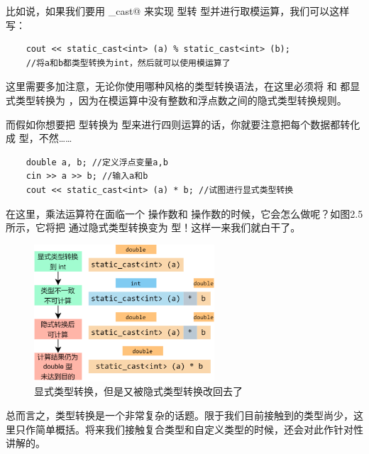 比如说，如果我们要用 \lstinline@static_cast@ 来实现 \lstinline@double@ 型转 \lstinline@int@ 型并进行取模运算，我们可以这样写：
\begin{lstlisting}
    cout << static_cast<int> (a) % static_cast<int> (b);
    //将a和b都类型转换为int，然后就可以使用模运算了
\end{lstlisting}
这里需要多加注意，无论你使用哪种风格的类型转换语法，在这里必须将 \lstinline@a@ 和 \lstinline@b@ 都显式类型转换为 \lstinline@int@，因为在模运算中没有整数和浮点数之间的隐式类型转换规则。\par
而假如你想要把 \lstinline@double@ 型转换为 \lstinline@int@ 型来进行四则运算的话，你就要注意把每个数据都转化成 \lstinline@int@ 型，不然……
\begin{lstlisting}
    double a, b; //定义浮点变量a,b
    cin >> a >> b; //输入a和b
    cout << static_cast<int> (a) * b; //试图进行显式类型转换
\end{lstlisting}
在这里，乘法运算符在面临一个 \lstinline@int@ 操作数和 \lstinline@double@ 操作数的时候，它会怎么做呢？如图2.5所示，它将把 \lstinline@int@ 通过隐式类型转换变为 \lstinline@double@ 型！这样一来我们就白干了。\par
\begin{figure}[htbp]
    \centering
    \includegraphics[width=0.6\textwidth]{../images/generalized_parts/02_Explicit_type_cast_from_double_to_int_in_vain_300.png}
    \caption{显式类型转换，但是又被隐式类型转换改回去了}
\end{figure}
总而言之，类型转换是一个非常复杂的话题。限于我们目前接触到的类型尚少，这里只作简单概括。将来我们接触复合类型和自定义类型的时候，还会对此作针对性讲解的。\par
